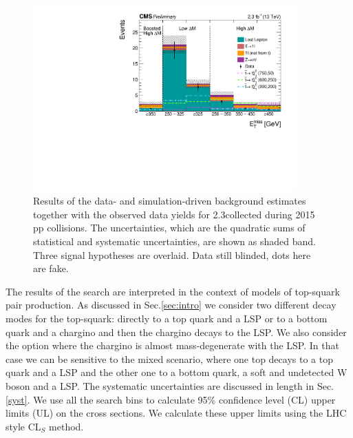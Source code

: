 \begin{figure}[htb]
\centering
\includegraphics[width=0.90\textwidth]{plots_stop/Results_2p3fbinv.pdf}
\caption{\label{fig:results}Results of the data- and simulation-driven background estimates together with the observed data yields for 2.3\fbinv collected during 2015 pp collisions. The uncertainties, which are the quadratic sums of statistical and systematic uncertainties, are shown as shaded band. Three signal hypotheses are overlaid. {\color{red} Data still blinded, dots here are fake.}}
\end{figure}

The results of the search are interpreted in the context of models of top-squark pair production.  As discussed in Sec.\ref{sec:intro} we consider two different decay modes for the top-squark: directly to a top quark and a LSP or to a bottom quark and a chargino and then the chargino decays to the LSP.  We also consider the option where the chargino is almost mass-degenerate with the LSP.  In that case we can be sensitive to the mixed scenario, where one top decays to a top quark and a LSP and the other one to a bottom quark, a soft and undetected W boson and a LSP.  The systematic uncertainties are discussed in length in Sec.\ref{syst}.  We use all the search bins to calculate 95\% confidence level (CL) upper limits (UL) on the cross sections.  We calculate these upper limits using the LHC style CL$_{S}$ method\cite{Higgscombine}.

